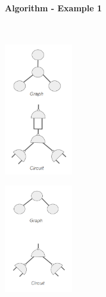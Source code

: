 \documentclass{article}
\begin{document}
\paragraph{Algorithm - Example 1}\mbox{}\\

\begin{minipage}[t]{0.5\textwidth}
    \centering
    \includegraphics[width=3cm, scale=1]{S4/subjectGraph.PNG}
    \captionsetup{justification=centering}
\end{minipage}%
\begin{minipage}[t]{0.5\textwidth}
    \centering
    \includegraphics[width=3cm, scale=1]{S4/patternGraph.PNG}
    \captionsetup{justification=centering}
\end{minipage}%
\end{document}
